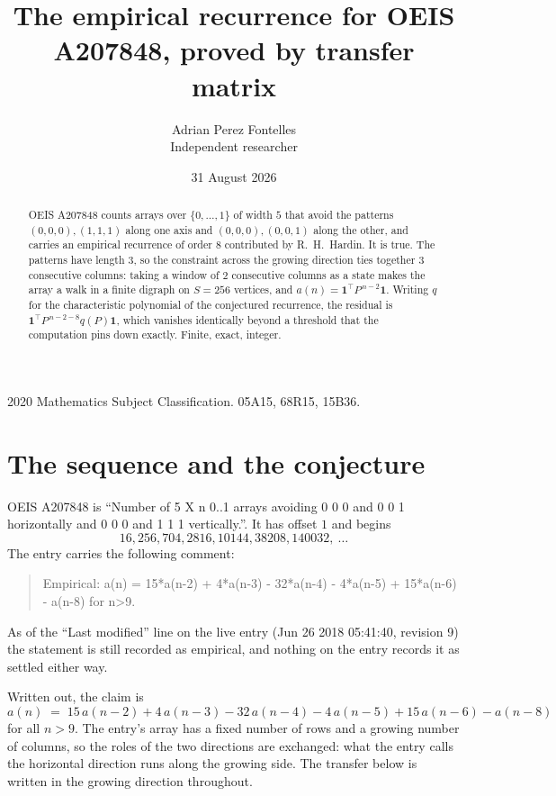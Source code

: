 \documentclass[11pt,a4paper]{article}
\title{The empirical recurrence for OEIS A207848, proved by transfer matrix}
\author{Adrian Perez Fontelles\\ \small Independent researcher}
\date{31 August 2026}
\theoremstyle{plain}
\theoremstyle{definition}
\begin{document}
\maketitle

\begin{abstract}
OEIS A207848 counts arrays over $\{0,\dots,1\}$ of width $5$ that avoid the patterns
$(0,0,0), (1,1,1)$ along one axis and $(0,0,0), (0,0,1)$ along the other, and carries an empirical recurrence of
order $8$ contributed by R.~H.~Hardin. It is true. The patterns have length $3$, so
the constraint across the growing direction ties together $3$ consecutive columns: taking a
window of $2$ consecutive columns as a state makes the array a walk in a finite digraph
on $S=256$ vertices, and $a(n)=\mathbf{1}^{\!\top}P^{\,n-2}\mathbf{1}$. Writing $q$
for the characteristic polynomial of the conjectured recurrence, the residual is
$\mathbf{1}^{\!\top}P^{\,n-2-8}q(P)\mathbf{1}$, which vanishes identically
beyond a threshold that the computation pins down exactly. Finite, exact, integer.
\end{abstract}

\noindent\small 2020 Mathematics Subject Classification. 05A15, 68R15, 15B36.\normalsize

\section{The sequence and the conjecture}

OEIS A207848 is ``Number of 5 X n 0..1 arrays avoiding 0 0 0 and 0 0 1 horizontally and 0 0 0 and 1 1 1 vertically.''. It has offset
$1$ and begins
\[
16, 256, 704, 2816, 10144, 38208, 140032,\ \dots
\]
The entry carries the following comment:
\begin{quote}\small
Empirical: a(n) = 15*a(n-2) + 4*a(n-3) - 32*a(n-4) - 4*a(n-5) + 15*a(n-6) - a(n-8) for n>9.
\end{quote}
As of the ``Last modified'' line on the live entry (Jun 26 2018 05:41:40, revision
9) the statement is still recorded as empirical, and nothing on the entry
records it as settled either way.

Written out, the claim is
\begin{equation}\label{eq:conj}
a(n)\;=\;15\,a(n-2) + 4\,a(n-3) - 32\,a(n-4) - 4\,a(n-5) + 15\,a(n-6) - a(n-8)
\end{equation}
for all $n>9$. The entry's array has a fixed number of rows and a growing number of
columns, so the roles of the two directions are exchanged: what the entry calls the
horizontal direction runs along the growing side. The transfer below is written in the
growing direction throughout.
\end{document}
